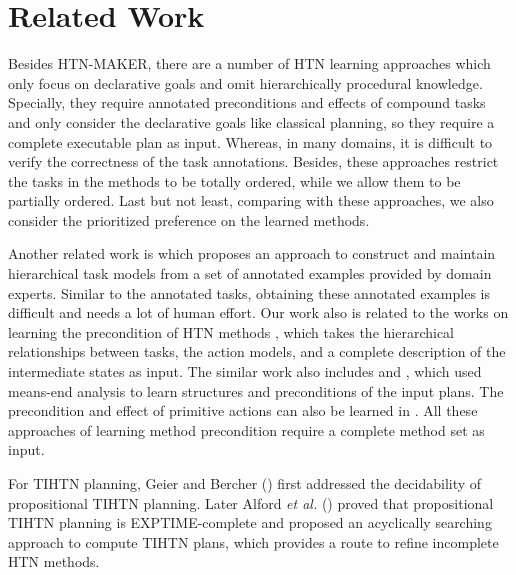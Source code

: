 \documentclass[letterpaper]{article} %
\begin{document}
\section{Related Work}
Besides HTN-MAKER, there are a number of HTN learning approaches \cite{DBLP:conf/ecai/LotinacJ16,DBLP:journals/ai/ZhuoM014}
which only focus on declarative goals and omit hierarchically procedural knowledge.
Specially, they require annotated preconditions and effects of compound tasks and only consider the declarative goals like classical planning, so they require a complete executable plan as input. Whereas, %
in many domains, it is difficult to verify the correctness of the task annotations. %
Besides, these approaches restrict the tasks in the methods to be totally ordered, while we allow them to be partially ordered.
Last but not least, comparing with these approaches, we also consider the prioritized preference on the learned methods. %

Another related work is \cite{DBLP:conf/kcap/GarlandRR01} which proposes an approach to construct and maintain hierarchical task models from a set of annotated examples provided by domain experts.
Similar to the annotated tasks, obtaining these annotated examples is difficult and needs a lot of human effort.
Our work also is related to the works on learning the precondition of HTN methods \cite{DBLP:conf/icml/IlghamiMNA05,DBLP:conf/aaai/XuM05}, which takes the hierarchical relationships between tasks, the action models, and a complete description of the intermediate states as input. The similar work also includes \cite{DBLP:conf/icml/NejatiLK06} and \cite{ReddyT97}, which used means-end analysis to learn structures and preconditions of the input plans. The precondition and effect of primitive actions can also be learned in \cite{DBLP:conf/ijcai/ZhuoHHYM09}.
All these approaches of learning method precondition require a complete method set as input.

For TIHTN planning,
Geier and Bercher (\citeyear{geier2011decidability}) first addressed the decidability of propositional TIHTN planning.
Later Alford \emph{et al.} (\citeyear{alford2015tighttihtn}) proved that propositional TIHTN planning is EXPTIME-complete and proposed an acyclically searching approach to compute TIHTN plans, which provides a route to refine incomplete HTN methods.
\end{document}
